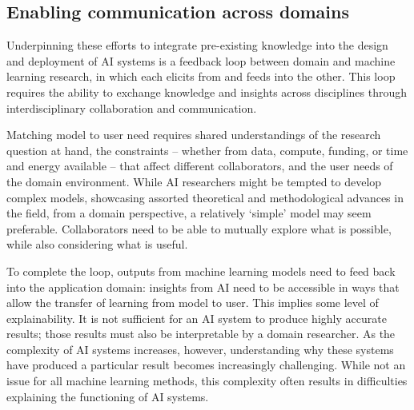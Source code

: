 \subsection{Enabling communication across
domains}\label{enabling-communication-across-domains}

Underpinning these efforts to integrate pre-existing knowledge into the
design and deployment of AI systems is a feedback loop between domain
and machine learning research, in which each elicits from and feeds into
the other. This loop requires the ability to exchange knowledge and
insights across disciplines through interdisciplinary collaboration and
communication.

Matching model to user need requires shared understandings of the
research question at hand, the constraints -- whether from data,
compute, funding, or time and energy available -- that affect different
collaborators, and the user needs of the domain environment. While AI
researchers might be tempted to develop complex models, showcasing
assorted theoretical and methodological advances in the field, from a
domain perspective, a relatively `simple' model may seem preferable.
Collaborators need to be able to mutually explore what is possible,
while also considering what is useful.

To complete the loop, outputs from machine learning models need to feed
back into the application domain: insights from AI need to be accessible
in ways that allow the transfer of learning from model to user. This
implies some level of explainability. It is not sufficient for an AI
system to produce highly accurate results; those results must also be
interpretable by a domain researcher. As the complexity of AI systems
increases, however, understanding why these systems have produced a
particular result becomes increasingly challenging. While not an issue
for all machine learning methods, this complexity often results in
difficulties explaining the functioning of AI systems.

